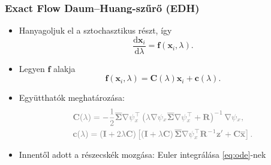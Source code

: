 \documentclass{beamer}
\def\light#1{{\color{light}#1}}
\begin{document}
\begin{frame}
    \frametitle{Exact Flow Daum--Huang-szűrő (EDH)}
    \begin{itemize}[<+->]
        \item Hanyagoljuk el a sztochasztikus részt, így \\
              \begin{equation}\label{eq:ode}
                  \frac{\mathrm{d}\mathbf{x}_i}{\mathrm{d}\lambda} = \mathbf{f}(\mathbf{x}_i,\lambda).
              \end{equation}
        \item Legyen $\mathbf{f}$ alakja
              \begin{equation}\label{eq:edh-flow-vector}
                  \mathbf{f}(\mathbf{x}_i,\lambda) = \mathbf{C}(\lambda)\mathbf{x}_i + \mathbf{c}(\lambda).
              \end{equation}
        \item Együtthatók meghatározása:
              \begin{align}
                   & \light{\mathbf{C}(\lambda) = -\frac{1}{2}\mathbf{\mathbf{\overline\Sigma}}\nabla \psi_x^\top\left(\lambda \nabla \psi_x\mathbf{\overline\Sigma}\nabla \psi_x^\top + \mathbf{R}\right)^{-1}\nabla \psi_x,\label{eq:edh-C}     }                          \\
                   & \light{\mathbf{c}(\lambda) = \left(\mathbf{I}+2\lambda\mathbf{C}\right)\left[\left(\mathbf{I}+\lambda\mathbf{C}\right)\mathbf{\overline\Sigma}\nabla \psi_x^\top\mathbf{R}^{-1}\mathbf{z}' + \mathbf{C}\overline{\mathbf{x}}\right]. } \label{eq:edh-c}
              \end{align}
        \item Innentől adott a részecskék mozgása: Euler integrálása \eqref{eq:ode}-nek
    \end{itemize}
\end{frame}
\end{document}

